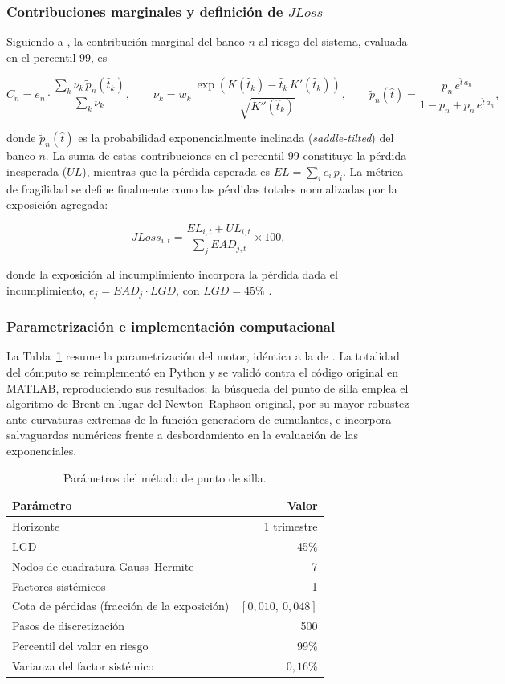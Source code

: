 \subsubsection{Contribuciones marginales y definición de \texorpdfstring{$JLoss$}{JLoss}}

Siguiendo a \citet{MartinThompsonBrowne2001}, la contribución marginal del banco $n$ al riesgo del sistema, evaluada en el percentil 99, es

\[ C_n = e_n \cdot \frac{\sum_{k} \nu_k\,\tilde p_n(\hat t_k)}{\sum_{k}\nu_k}, \qquad \nu_k = w_k\,\frac{\exp\!\left(K(\hat t_k) - \hat t_k\,K'(\hat t_k)\right)}{\sqrt{K''(\hat t_k)}}, \qquad \tilde p_n(\hat t) = \frac{p_n\,e^{\hat t\,a_n}}{1 - p_n + p_n\,e^{\hat t\,a_n}}, \]

donde $\tilde p_n(\hat t)$ es la probabilidad exponencialmente inclinada (\textit{saddle-tilted}) del banco $n$. La suma de estas contribuciones en el percentil 99 constituye la pérdida inesperada ($UL$), mientras que la pérdida esperada es $EL = \sum_i e_i\,p_i$. La métrica de fragilidad se define finalmente como las pérdidas totales normalizadas por la exposición agregada:

\[ JLoss_{i,t} = \frac{EL_{i,t} + UL_{i,t}}{\sum_{j} EAD_{j,t}}\times 100, \]

donde la exposición al incumplimiento incorpora la pérdida dada el incumplimiento, $e_j = EAD_j\cdot LGD$, con $LGD = 45\%$ \citep{BIS2006}.

\subsubsection{Parametrización e implementación computacional}

La Tabla~\ref{tab:params} resume la parametrización del motor, idéntica a la de \citet{Chari2024b}. La totalidad del cómputo se reimplementó en Python y se validó contra el código original en MATLAB, reproduciendo sus resultados; la búsqueda del punto de silla emplea el algoritmo de Brent en lugar del Newton--Raphson original, por su mayor robustez ante curvaturas extremas de la función generadora de cumulantes, e incorpora salvaguardas numéricas frente a desbordamiento en la evaluación de las exponenciales.

\begin{table}[htbp]
\centering
\small
\caption{Parámetros del método de punto de silla.}
\label{tab:params}
\begin{tabular}{lr}
\toprule
Parámetro & Valor \\
\midrule
Horizonte & 1 trimestre \\
LGD & 45\% \\
Nodos de cuadratura Gauss--Hermite & 7 \\
Factores sistémicos & 1 \\
Cota de pérdidas (fracción de la exposición) & $[0{,}010,\ 0{,}048]$ \\
Pasos de discretización & 500 \\
Percentil del valor en riesgo & 99\% \\
Varianza del factor sistémico & $0{,}16$\% \\
\bottomrule
\end{tabular}
\end{table}

